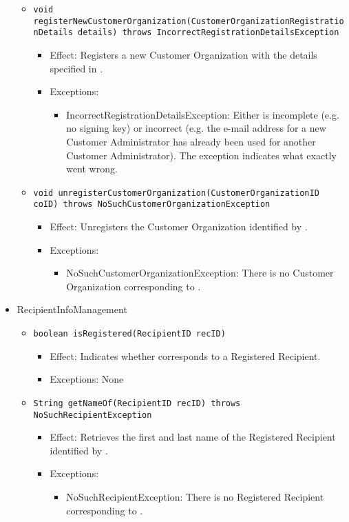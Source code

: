 \begin{itemize}
\begin{itemize}
		\item \texttt{void registerNewCustomerOrganization(CustomerOrganizationRegistrationDetails details) throws IncorrectRegistrationDetailsException}
		    \begin{itemize}
                \item Effect: Registers a new Customer Organization with the details specified in .
                \item Exceptions:
				\begin{itemize}
					\item IncorrectRegistrationDetailsException: Either  is incomplete (e.g. no signing key) or incorrect (e.g. the e-mail address for a new Customer Administrator has already been used for another Customer Administrator). The exception indicates what exactly went wrong.
				\end{itemize}
            \end{itemize}

		\item \texttt{void unregisterCustomerOrganization(CustomerOrganizationID coID) throws NoSuchCustomerOrganizationException}
		    \begin{itemize}
                \item Effect: Unregisters the Customer Organization identified by .
                \item Exceptions:
				\begin{itemize}
					\item NoSuchCustomerOrganizationException: There is no Customer Organization corresponding to .
				\end{itemize}
            \end{itemize}
    \end{itemize}

    \item RecipientInfoManagement
    \begin{itemize}
        \item \texttt{boolean isRegistered(RecipientID recID)}
        \begin{itemize}
            \item Effect: Indicates whether  corresponds to a Registered Recipient.
            \item Exceptions: None
        \end{itemize}

		\item \texttt{String getNameOf(RecipientID recID) throws NoSuchRecipientException}
        \begin{itemize}
            \item Effect: Retrieves the first and last name of the Registered Recipient identified by .
            \item Exceptions:
			\begin{itemize}
				\item NoSuchRecipientException: There is no Registered Recipient corresponding to .
			\end{itemize}
        \end{itemize}


\end{itemize}
\end{itemize}
